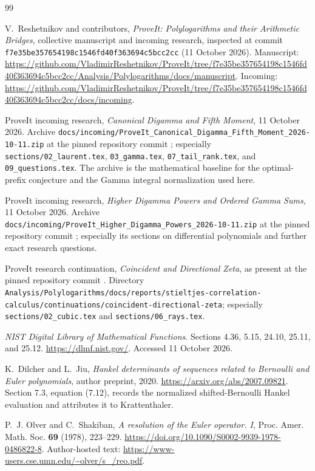 \documentclass[11pt,a4paper]{article}
\numberwithin{equation}{section}
\theoremstyle{plain}
\theoremstyle{definition}
\theoremstyle{remark}
\newcommand{\src}[1]{\nolinkurl{#1}}
\begin{document}
\begin{thebibliography}{99}

V.~Reshetnikov and contributors,
\emph{ProveIt: Polylogarithms and their Arithmetic Bridges},
collective manuscript and incoming research, inspected at commit
\texttt{f7e35be357654198c1546fd40f363694c5bcc2cc} (11 October 2026).
Manuscript: \url{https://github.com/VladimirReshetnikov/ProveIt/tree/f7e35be357654198c1546fd40f363694c5bcc2cc/Analysis/Polylogarithms/docs/manuscript}.
Incoming: \url{https://github.com/VladimirReshetnikov/ProveIt/tree/f7e35be357654198c1546fd40f363694c5bcc2cc/docs/incoming}.

ProveIt incoming research,
\emph{Canonical Digamma and Fifth Moment}, 11 October 2026.
Archive \src{docs/incoming/ProveIt_Canonical_Digamma_Fifth_Moment_2026-10-11.zip}
at the pinned repository commit \cite{Repo}; especially
\src{sections/02_laurent.tex}, \src{03_gamma.tex},
\src{07_tail_rank.tex}, and \src{09_questions.tex}.
The archive is the mathematical baseline for the optimal-prefix
conjecture and the Gamma integral normalization used here.

ProveIt incoming research,
\emph{Higher Digamma Powers and Ordered Gamma Sums}, 11 October 2026.
Archive \src{docs/incoming/ProveIt_Higher_Digamma_Powers_2026-10-11.zip}
at the pinned repository commit \cite{Repo}; especially its sections
on differential polynomials and further exact research questions.

ProveIt research continuation,
\emph{Coincident and Directional Zeta}, as present at the pinned
repository commit \cite{Repo}.
Directory
\src{Analysis/Polylogarithms/docs/reports/stieltjes-correlation-calculus/continuations/coincident-directional-zeta};
especially \src{sections/02_cubic.tex} and \src{sections/06_rays.tex}.

\emph{NIST Digital Library of Mathematical Functions}.
Sections 4.36, 5.15, 24.10, 25.11, and 25.12.
\url{https://dlmf.nist.gov/}. Accessed 11 October 2026.

K.~Dilcher and L.~Jiu,
\emph{Hankel determinants of sequences related to Bernoulli and
Euler polynomials}, author preprint, 2020.
\url{https://arxiv.org/abs/2007.09821}.
Section 7.3, equation (7.12), records the normalized shifted-Bernoulli
Hankel evaluation and attributes it to Krattenthaler.

P.~J. Olver and C.~Shakiban,
\emph{A resolution of the Euler operator. I},
Proc. Amer. Math. Soc. \textbf{69} (1978), 223--229.
\url{https://doi.org/10.1090/S0002-9939-1978-0486822-8}.
Author-hosted text:
\url{https://www-users.cse.umn.edu/~olver/s_/reo.pdf}.


\end{thebibliography}
\end{document}
